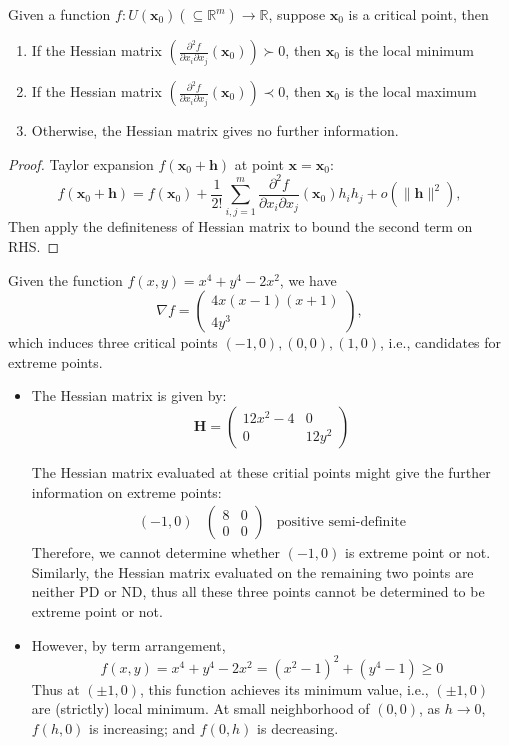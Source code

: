 \begin{theorem}
Given a function $f:U(\bm x_0)(\subseteq\mathbb{R}^m)\to\mathbb{R}$, suppose $\bm x_0$ is a critical point, then
\begin{enumerate}
\item
If the Hessian matrix $\left(\frac{\partial^2f}{\partial x_i\partial x_j}(\bm x_0)\right)\succ0$, then $\bm x_0$ is the local minimum
\item
If the Hessian matrix $\left(\frac{\partial^2f}{\partial x_i\partial x_j}(\bm x_0)\right)\prec0$, then $\bm x_0$ is the local maximum
\item
Otherwise, the Hessian matrix gives no further information.
\end{enumerate}
\end{theorem}
\begin{proof}
Taylor expansion $f(\bm x_0+\bm h)$ at point $\bm x=\bm x_0$:
\[
f(\bm x_0+\bm h)=f(\bm x_0)+\frac{1}{2!}\sum_{i,j=1}^m\frac{\partial^2f}{\partial x_i\partial x_j}(\bm x_0)h_ih_j+o(\|\bm h\|^2),
\]
Then apply the definiteness of Hessian matrix to bound the second term on RHS.
\end{proof}
\begin{example}
Given the function $f(x,y)=x^4+y^4-2x^2$, we have
\[
\nabla f=\begin{pmatrix}
4x(x-1)(x+1)\\4y^3
\end{pmatrix},
\]
which induces three critical points $(-1,0),(0,0),(1,0)$, i.e., candidates for extreme points.
\begin{itemize}
\item
The Hessian matrix is given by:
\[
\bm H=\begin{pmatrix}
12x^2-4&0\\
0&12y^2
\end{pmatrix}
\]

The Hessian matrix evaluated at these critial points might give the further information on extreme points:
\[
\begin{array}{lll}
(-1,0)
&
\begin{pmatrix}
8&0\\0&0
\end{pmatrix}
&
\mbox{positive semi-definite}
\end{array}
\]
Therefore, we cannot determine whether $(-1,0)$ is extreme point or not. Similarly, the Hessian matrix evaluated on the remaining two points are neither PD or ND, thus all these three points cannot be determined to be extreme point or not.
\item
However, by term arrangement,
\[
f(x,y)=x^4+y^4-2x^2=(x^2-1)^2+(y^4-1)\ge0
\]
Thus at $(\pm1,0)$, this function achieves its minimum value, i.e., $(\pm1,0)$ are (strictly) local minimum. At small neighborhood of $(0,0)$, as $h\to0$, $f(h,0)$ is increasing; and $f(0,h)$ is decreasing.
\end{itemize}
\end{example}

